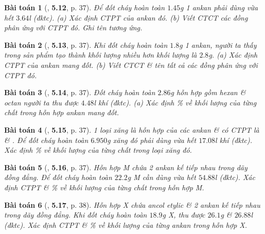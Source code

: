 \documentclass{article}
\numberwithin{equation}{section}
\newtheorem{baitoan}{Bài toán}[section]
\begin{document}
\begin{baitoan}[\cite{SBT_Hoa_Hoc_11_co_ban}, \textbf{5.12}, p. 37]
	Để đốt cháy hoàn toàn $1.45$\emph{g} 1 ankan phải dùng vừa hết $3.64$\emph{l} \emph{} (đktc). (a) Xác định CTPT của ankan đó. (b) Viết CTCT các đồng phân ứng với CTPT đó. Ghi tên tương ứng.
\end{baitoan}

\begin{baitoan}[\cite{SBT_Hoa_Hoc_11_co_ban}, \textbf{5.13}, p. 37]
	Khi đốt cháy hoàn toàn $1.8$\emph{g} 1 ankan, người ta thấy trong sản phẩm tạo thành khối lượng \emph{} nhiều hơn khối lượng \emph{} là $2.8$\emph{g}. (a) Xác định CTPT của ankan mang đốt. (b) Viết CTCT \& tên tất cả các đồng phân ứng với CTPT đó.
\end{baitoan}

\begin{baitoan}[\cite{SBT_Hoa_Hoc_11_co_ban}, \textbf{5.14}, p. 37]
	Đốt cháy hoàn toàn $2.86$\emph{g} hỗn hợp gồm hexan \& octan người ta thu được $4.48$\emph{l} khí \emph{} (đktc). (a) Xác định \% về khối lượng của từng chất trong hỗn hợp ankan mang đốt.
\end{baitoan}

\begin{baitoan}[\cite{SBT_Hoa_Hoc_11_co_ban}, \textbf{5.15}, p. 37]
	1 loại xăng là hỗn hợp của các ankan \& có CTPT là \emph{} \& \emph{}. Để đốt cháy hoàn toàn $6.950$\emph{g} xăng đó phải dùng vừa hết $17.08$\emph{l} khí \emph{} (đktc). Xác định \% về khối lượng của từng chất trong loại xăng đó. 
\end{baitoan}

\begin{baitoan}[\cite{SBT_Hoa_Hoc_11_co_ban}, \textbf{5.16}, p. 37]
	Hỗn hợp M chứa 2 ankan kế tiếp nhau trong dãy đồng đẳng. Để đốt cháy hoàn toàn $22.2$\emph{g} M cần dùng vừa hết $54.88$\emph{l} \emph{} (đktc). Xác định CTPT \& \% về khối lượng của từng chất trong hỗn hợp M.
\end{baitoan}

\begin{baitoan}[\cite{SBT_Hoa_Hoc_11_co_ban}, \textbf{5.17}, p. 38]
	Hỗn hợp X chứa ancol etylic \emph{} \& 2 ankan kế tiếp nhau trong dãy đồng đẳng. Khi đốt cháy hoàn toàn $18.9$\emph{g} X, thu được $26.1$\emph{g } \& $26.88$\emph{l } (đktc). Xác định CTPT \& \% về khối lượng của từng ankan trong hỗn hợp X.
\end{baitoan}
\end{document}
